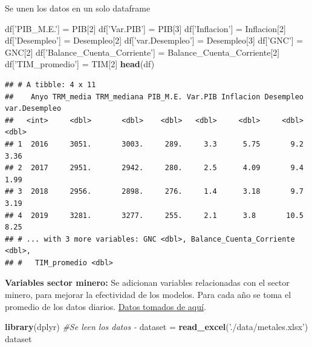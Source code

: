 \documentclass[
  11pt,
  a4paper,
]{book}
\newenvironment{Shaded}{\begin{snugshade}}{\end{snugshade}}
\newcommand{\CommentTok}[1]{\textcolor[rgb]{0.56,0.35,0.01}{\textit{#1}}}
\newcommand{\DecValTok}[1]{\textcolor[rgb]{0.00,0.00,0.81}{#1}}
\newcommand{\KeywordTok}[1]{\textcolor[rgb]{0.13,0.29,0.53}{\textbf{#1}}}
\newcommand{\NormalTok}[1]{#1}
\newcommand{\StringTok}[1]{\textcolor[rgb]{0.31,0.60,0.02}{#1}}
\begin{document}
Se unen los datos en un solo dataframe

\begin{Shaded}
\begin{Highlighting}[]
\NormalTok{df[}\StringTok{'PIB_M.E.'}\NormalTok{] =}\StringTok{ }\NormalTok{PIB[}\DecValTok{2}\NormalTok{]}
\NormalTok{df[}\StringTok{'Var.PIB'}\NormalTok{] =}\StringTok{ }\NormalTok{PIB[}\DecValTok{3}\NormalTok{]}
\NormalTok{df[}\StringTok{'Inflacion'}\NormalTok{] =}\StringTok{ }\NormalTok{Inflacion[}\DecValTok{2}\NormalTok{]}
\NormalTok{df[}\StringTok{'Desempleo'}\NormalTok{] =}\StringTok{ }\NormalTok{Desempleo[}\DecValTok{2}\NormalTok{]}
\NormalTok{df[}\StringTok{'var.Desempleo'}\NormalTok{] =}\StringTok{ }\NormalTok{Desempleo[}\DecValTok{3}\NormalTok{]}
\NormalTok{df[}\StringTok{'GNC'}\NormalTok{] =}\StringTok{ }\NormalTok{GNC[}\DecValTok{2}\NormalTok{]}
\NormalTok{df[}\StringTok{'Balance_Cuenta_Corriente'}\NormalTok{] =}\StringTok{ }\NormalTok{Balance_Cuenta_Corriente[}\DecValTok{2}\NormalTok{]}
\NormalTok{df[}\StringTok{'TIM_promedio'}\NormalTok{] =}\StringTok{ }\NormalTok{TIM[}\DecValTok{2}\NormalTok{]}
\KeywordTok{head}\NormalTok{(df)}
\end{Highlighting}
\end{Shaded}

\begin{verbatim}
## # A tibble: 4 x 11
##    Anyo TRM_media TRM_mediana PIB_M.E. Var.PIB Inflacion Desempleo var.Desempleo
##   <int>     <dbl>       <dbl>    <dbl>   <dbl>     <dbl>     <dbl>         <dbl>
## 1  2016     3051.       3003.     289.     3.3      5.75       9.2          3.36
## 2  2017     2951.       2942.     280.     2.5      4.09       9.4          1.99
## 3  2018     2956.       2898.     276.     1.4      3.18       9.7          3.19
## 4  2019     3281.       3277.     255.     2.1      3.8       10.5          8.25
## # ... with 3 more variables: GNC <dbl>, Balance_Cuenta_Corriente <dbl>,
## #   TIM_promedio <dbl>
\end{verbatim}

\textbf{Variables sector minero:} Se adicionan variables relacionadas
con el sector minero, para mejorar la efectividad de los modelos. Para
cada año se toma el promedio de los datos diarios.
\href{https://www.banrep.gov.co/es/estadisticas/precios-del-dia-para-el-gramo-oro-plata-y-platino}{Datos
tomados de aquí}.

\begin{Shaded}
\begin{Highlighting}[]
\KeywordTok{library}\NormalTok{(dplyr)}
\CommentTok{#Se leen los datos -  }
\NormalTok{dataset =}\StringTok{ }\KeywordTok{read_excel}\NormalTok{(}\StringTok{'./data/metales.xlsx'}\NormalTok{)}
\NormalTok{dataset}
\end{Highlighting}
\end{Shaded}
\end{document}
